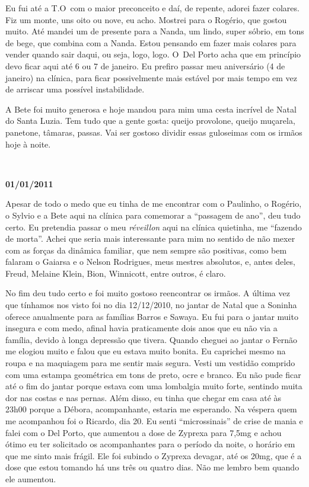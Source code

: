 Eu fui até a T.O\, com o maior preconceito e daí, de repente, adorei fazer
colares. Fiz um monte, uns oito ou nove, eu acho. Mostrei para o
Rogério, que gostou muito. Até mandei um de presente para a Nanda, um
lindo, super sóbrio, em tons de bege, que combina com a Nanda. Estou
pensando em fazer mais colares para vender quando sair daqui, ou seja,
logo, logo. O~Del Porto acha que em princípio devo ficar aqui até 6 ou 7
de janeiro. Eu prefiro passar meu aniversário (4 de janeiro) na clínica,
para ficar possivelmente mais estável por mais tempo em vez de arriscar
uma possível instabilidade.

A Bete foi muito generosa e hoje mandou para mim uma cesta incrível de
Natal do Santa Luzia. Tem tudo que a gente gosta: queijo provolone,
queijo muçarela, panetone, tâmaras, passas. Vai ser gostoso dividir
essas guloseimas com os irmãos hoje à noite.

\begin{center}\asterisc{}​\end{center}


\begin{flushright}\textbf{01/01/2011}\end{flushright}


Apesar de todo o medo que eu tinha de me encontrar com o Paulinho, o
Rogério, o Sylvio e a Bete aqui na clínica para comemorar a ``passagem
de ano'', deu tudo certo. Eu pretendia passar o meu \emph{réveillon}
aqui na clínica quietinha, me ``fazendo de morta''. Achei que seria mais
interessante para mim no sentido de não mexer com as forças da dinâmica
familiar, que nem sempre são positivas, como bem falaram o Gaiarsa e o
Nelson Rodrigues, meus mestres absolutos, e, antes deles, Freud, Melaine
Klein, Bion, Winnicott, entre outros, é claro.

No fim deu tudo certo e foi muito gostoso reencontrar os irmãos. A 
última vez que tínhamos nos visto foi no dia 12/12/2010, no jantar de
Natal que a Soninha oferece anualmente para as famílias Barros e Sawaya.
Eu fui para o jantar muito insegura e com medo, afinal havia
praticamente dois anos que eu não via a família, devido à longa
depressão que tivera. Quando cheguei ao jantar o Fernão me elogiou
muito e falou que eu estava muito bonita. Eu caprichei mesmo na roupa e
na maquiagem para me sentir mais segura. Vesti um vestidão comprido com
uma estampa geométrica em tons de preto, ocre e branco. Eu não pude
ficar até o fim do jantar porque estava com uma lombalgia muito forte,
sentindo muita dor nas costas e nas pernas. Além disso, eu tinha que
chegar em casa até às 23h00 porque a Débora, acompanhante, estaria me
esperando. Na véspera quem me acompanhou foi o Ricardo, dia 20. Eu senti
``microssinais'' de crise de mania e falei com o Del Porto, que aumentou
a dose de Zyprexa para 7,5mg e achou ótimo eu ter solicitado os
acompanhantes para o período da noite, o horário em que me sinto mais
frágil. Ele foi subindo o Zyprexa devagar, até os 20mg, que é a dose que
estou tomando há uns três ou quatro dias. Não me lembro bem quando ele
aumentou.


